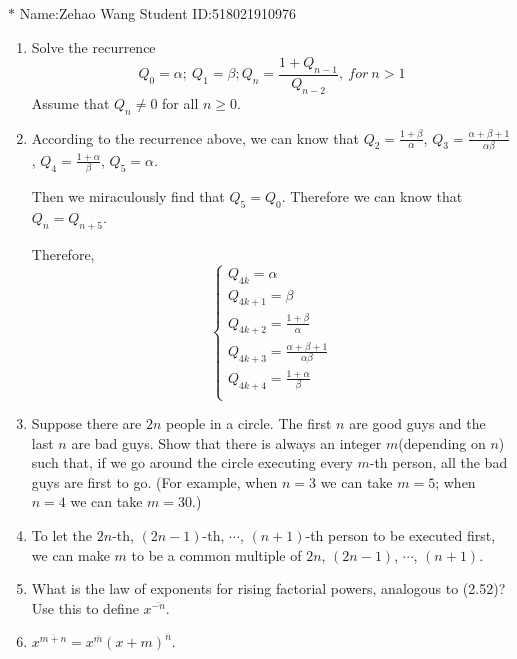 \documentclass[12pt,a4paper]{article}
\makeatletter
\newtheorem*{solution}{Solution}
\theoremstyle{definition}
\renewenvironment{solution}[1][Solution] {\par\pushQED{\qed}\normalfont\topsep6\p@\@plus6\p@\relax\trivlist\item[\hskip\labelsep\bfseries#1\@addpunct{.}]\ignorespaces}{\popQED\endtrivlist\@endpefalse} \makeatother
\makeatother
\begin{document}
\noindent

\noindent{}
\begin{center}
\footnotesize{\color{blue}$*$ Name:Zehao Wang  \quad Student ID:518021910976}
\end{center}
\begin{enumerate}
	\item
	Solve the recurrence
	\begin{equation*}
	    Q_0=\alpha;\ Q_1=\beta;
	    Q_n=\frac{1+Q_{n-1}}{Q_{n-2}},\ for\ n>1
	\end{equation*}
	Assume that $Q_n\neq 0$ for all $n\ge0$.
	\begin{solution}
	    According to the recurrence above, we can know that $Q_2=\frac{1+\beta}{\alpha}$, $Q_3=\frac{\alpha+\beta+1}{\alpha\beta}$, $Q_4=\frac{1+\alpha}{\beta}$, $Q_5=\alpha$.
	    
	    Then we miraculously find that $Q_5=Q_0$. Therefore we can know that $Q_{n}=Q_{n+5}$.
	    
	    Therefore,
	    \begin{equation*}
	        \begin{cases}
	            Q_{4k}=\alpha\\
	            Q_{4k+1}=\beta\\
	            Q_{4k+2}=\frac{1+\beta}{\alpha}\\
	            Q_{4k+3}=\frac{\alpha+\beta+1}{\alpha\beta}\\
	            Q_{4k+4}=\frac{1+\alpha}{\beta}\\
	        \end{cases}
	    \end{equation*}
	\end{solution}
    \item
    Suppose there are $2n$ people in a circle. The first $n$ are good guys and the last $n$ are bad guys.  Show that there is always an integer $m$(depending on $n$) such that, if we go around the circle executing every $m$-th person, all the bad guys are first to go. (For example, when $n=3$ we can take $m=5$; when $n=4$ we can take $m=30$.)
    \begin{solution}
        To let the $2n$-th, $(2n-1)$-th, $\cdots$, $(n+1)$-th person to be executed first, we can make $m$ to be a common multiple of $2n$, $(2n-1)$, $\cdots$, $(n+1)$.
    \end{solution}
    \item 
    What is the law of exponents for rising factorial powers, analogous to (2.52)? Use this to define $x^{\overline{-n}}$.
    \begin{solution}
        	$x^{\overline{m+n}}=x^{\overline{m}}(x+m)^{\overline{n}}$.
        	

\end{solution}
\end{enumerate}
\end{document}
